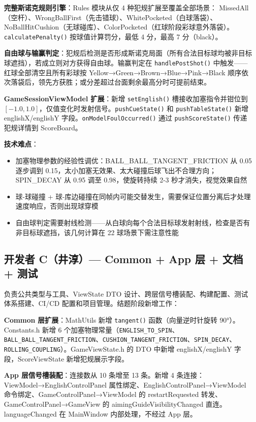 \documentclass[11pt]{ctexart}
\begin{document}
\textbf{完整斯诺克规则引擎}：Rules 模块从仅 4 种犯规扩展至覆盖全部场景：
MissedAll（空杆）、WrongBallFirst（先击错球）、WhitePocketed（白球落袋）、NoBallHitCushion（无球碰库）、ColorPocketed（红球阶段彩球意外落袋）。
\texttt{calculatePenalty()} 按球值计算罚分，最低 4 分，最高 7 分（black）。

\textbf{自由球与输赢判定}：犯规后检测是否形成斯诺克局面（所有合法目标球均被非目标球遮挡），若成立则对方获得自由球。输赢判定在 \texttt{handlePostShot()} 中触发——红球全部清空且所有彩球按 Yellow→Green→Brown→Blue→Pink→Black 顺序依次落袋后，领先方获胜；或分差超过台面剩余最高分时可提前结束。

\textbf{GameSessionViewModel 扩展}：新增 \texttt{setEnglish()} 槽接收加塞指令并钳位到 $[-1.0, 1.0]$，仅值变化时发射信号。\texttt{pushCueState()} 和 \texttt{pushTableState()} 新增 englishX/englishY 字段。\texttt{onModelFoulOccurred()} 通过 \texttt{pushScoreState()} 传递犯规详情到 ScoreBoard。

\textbf{技术难点}：
\begin{itemize}
\item 加塞物理参数的经验性调优：BALL\_BALL\_TANGENT\_FRICTION 从 0.05 逐步调到 0.15，太小加塞无效果、太大碰撞后球飞出不合理方向；SPIN\_DECAY 从 0.95 调至 0.98，使旋转持续 2-3 秒才消失，视觉效果自然
\item 球-球碰撞 + 球-库边碰撞在同帧内可能交替发生，需要保证位置分离后才处理速度响应，否则出现球穿模
\item 自由球判定需要射线检测——从白球向每个合法目标球发射射线，检查是否有非目标球遮挡，该几何计算在 22 球场景下需注意性能
\end{itemize}

\subsection{开发者 C（井淳）— Common + App 层 + 文档 + 测试}

负责公共类型与工具、ViewState DTO 设计、跨层信号槽装配、构建配置、测试体系搭建、CI/CD 配置和项目管理。结题阶段新增工作：

\textbf{Common 层扩展}：MathUtils 新增 \texttt{tangent()} 函数（向量逆时针旋转 90°）。Constants.h 新增 6 个加塞物理常量（\texttt{ENGLISH\_TO\_SPIN}、\texttt{BALL\_BALL\_TANGENT\_FRICTION}、\texttt{CUSHION\_TANGENT\_FRICTION}、\texttt{SPIN\_DECAY}、\texttt{ROLLING\_COUPLING}）。GameViewState.h 的 DTO 中新增 englishX/englishY 字段，ScoreViewState 新增犯规展示字段。

\textbf{App 层信号槽装配}：连接数从 10 条增至 13 条。新增 4 条连接：
ViewModel→EnglishControlPanel 属性绑定、EnglishControlPanel→ViewModel 命令绑定、GameControlPanel→ViewModel 的 restartRequested 转发、GameControlPanel→GameView 的 aimingGuideVisibilityChanged 直连。languageChanged 在 MainWindow 内部处理，不经过 App 层。
\end{document}
